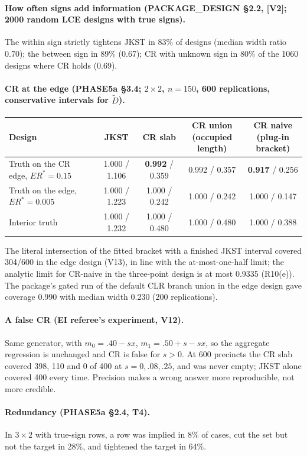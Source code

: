 \paragraph{How often signs add information (PACKAGE\_DESIGN \S2.2, [V2]; 2000 random
LCE designs with true signs).} The within sign strictly tightens JKST in 83\% of
designs (median width ratio 0.70); the between sign in 89\% (0.67); CR with
unknown sign in 80\% of the 1060 designs where CR holds (0.69).

\paragraph{CR at the edge (PHASE5a \S3.4; $2\times2$, $n=150$, 600 replications,
conservative intervals for $\tilde D$).}
\begin{center}\footnotesize
\begin{tabularx}{\linewidth}{@{}>{\raggedright\arraybackslash}X cccc@{}}
\toprule
Design & JKST & CR slab & \shortstack{CR union\\(occupied length)} & \shortstack{CR naive\\(plug-in bracket)} \\
\midrule
Truth on the CR edge, $ER^*=0.15$ & 1.000 / 1.106 & \textbf{0.992} / 0.359 & 0.992 / 0.357 & \textbf{0.917} / 0.256 \\
Truth on the edge, $ER^*=0.005$ & 1.000 / 1.223 & 1.000 / 0.242 & 1.000 / 0.242 & 1.000 / 0.147 \\
Interior truth & 1.000 / 1.232 & 1.000 / 0.480 & 1.000 / 0.480 & 1.000 / 0.388 \\
\bottomrule
\end{tabularx}
\end{center}
The literal intersection of the fitted bracket with a finished JKST interval
covered 304/600 in the edge design (V13), in line with the at-most-one-half limit;
the analytic limit for CR-naive in the three-point design is at most 0.9335
(R10(e)). The package's gated run of the default CLR branch union in the edge
design gave coverage 0.990 with median width 0.230 (200 replications).

\paragraph{A false CR (EI referee's experiment, V12).} Same generator, with
$m_0=.40-sx$, $m_1=.50+s-sx$, so the aggregate regression is unchanged and CR is
false for $s>0$. At 600 precincts the CR slab covered 398, 110 and 0 of 400 at
$s=0,.08,.25$, and was never empty; JKST alone covered 400 every time. Precision
makes a wrong answer more reproducible, not more credible.

\paragraph{Redundancy (PHASE5a \S2.4, T4).} In $3\times2$ with true-sign rows, a
row was implied in 8\% of cases, cut the set but not the target in 28\%, and
tightened the target in 64\%.
